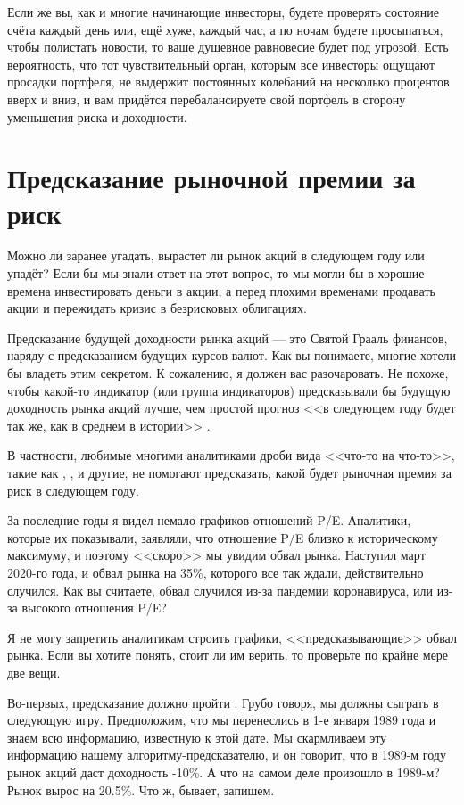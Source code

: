 Если же вы, как и многие начинающие инвесторы, будете проверять состояние счёта каждый день или, ещё хуже, каждый час, а по ночам будете просыпаться, чтобы полистать новости, то ваше душевное равновесие будет под угрозой. Есть вероятность, что тот чувствительный орган, которым все инвесторы ощущают просадки портфеля, не выдержит постоянных колебаний на несколько процентов вверх и вниз, и вам придётся перебалансируете свой портфель в сторону уменьшения риска и доходности.

\section*{Предсказание рыночной премии за риск}

Можно ли заранее угадать, вырастет ли рынок акций в следующем году или упадёт? Если бы мы знали ответ на этот вопрос, то мы могли бы в хорошие времена инвестировать деньги в акции, а перед плохими временами продавать акции и пережидать кризис в безрисковых облигациях.

Предсказание будущей доходности рынка акций --- это Святой Грааль финансов, наряду с предсказанием будущих курсов валют. Как вы понимаете, многие хотели бы владеть этим секретом. К сожалению, я должен вас разочаровать. Не похоже, чтобы какой-то индикатор (или группа индикаторов) предсказывали бы будущую доходность рынка акций лучше, чем простой прогноз <<в следующем году будет так же, как в среднем в истории>> \cite{welch2008comprehensive}.

В частности, любимые многими аналитиками дроби вида <<что-то на что-то>>, такие как , ,  и другие, не помогают предсказать, какой будет рыночная премия за риск в следующем году. 

За последние годы я видел немало графиков отношений P/E. Аналитики, которые их показывали, заявляли, что отношение P/E близко к историческому максимуму, и поэтому <<скоро>> мы увидим обвал рынка. Наступил март 2020-го года, и обвал рынка на 35\%, которого все так ждали, действительно случился. Как вы считаете, обвал случился из-за пандемии коронавируса, или из-за высокого отношения P/E?

Я не могу запретить аналитикам строить графики, <<предсказывающие>> обвал рынка. Если вы хотите понять, стоит ли им верить, то проверьте по крайне мере две вещи.

Во-первых, предсказание должно пройти  . Грубо говоря, мы должны сыграть в следующую игру. Предположим, что мы перенеслись в 1-е января 1989 года и знаем всю информацию, известную к этой дате. Мы скармливаем эту информацию нашему алгоритму-предсказателю, и он говорит, что в 1989-м году рынок акций даст доходность -10\%. А что на самом деле произошло в 1989-м? Рынок вырос на 20.5\%. Что ж, бывает, запишем.

